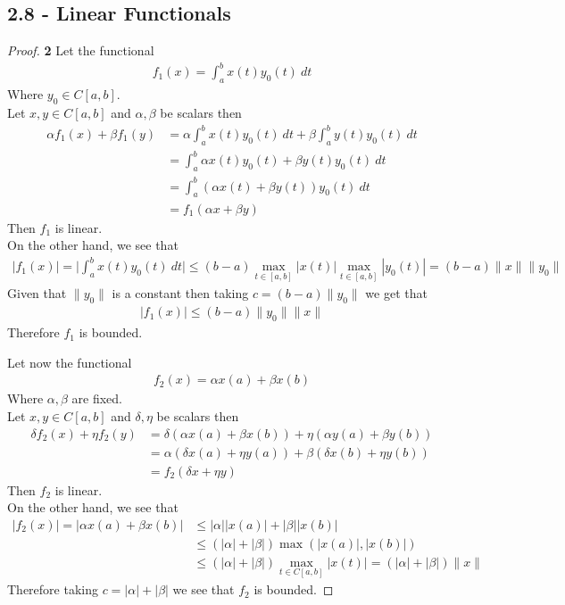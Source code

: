 \documentclass[11pt]{article}
\theoremstyle{definition}
\begin{document}
\subsection*{2.8 - Linear Functionals}
\begin{proof}{\textbf{2}}
    Let the functional
    \begin{align*}
        f_1(x) = \int_a^b x(t)y_0(t)~dt
    \end{align*}
    Where $y_0 \in C[a,b]$.\\
    Let $x,y \in C[a,b]$ and $\alpha, \beta$ be scalars then
    \begin{align*}
        \alpha f_1(x) + \beta f_1(y)
        &= \alpha \int_a^b x(t)y_0(t)~dt + \beta\int_a^b y(t)y_0(t)~dt\\
        &= \int_a^b \alpha x(t)y_0(t) + \beta y(t)y_0(t)~dt\\
        &= \int_a^b (\alpha x(t) + \beta y(t))y_0(t)~dt\\
        &= f_1(\alpha x + \beta y)
    \end{align*}
    Then $f_1$ is linear.\\
    On the other hand, we see that
    \begin{align*}
        |f_1(x)|
        = \bigg|\int_a^b x(t)y_0(t)~dt\bigg|
        \leq (b-a)\max_{t\in[a,b]} |x(t)| \max_{t \in [a,b]} |y_0(t)|
        =(b-a)\|x\|\|y_0\|
    \end{align*}
    Given that $\|y_0\|$ is a constant then taking $c = (b-a) \|y_0\|$ we get
    that
    \begin{align*}
        |f_1(x)| \leq (b-a)\|y_0\|\|x\|
    \end{align*}
    Therefore $f_1$ is bounded.

    Let now the functional
    \begin{align*}
        f_2(x) = \alpha x(a) + \beta x(b)
    \end{align*}
    Where $\alpha, \beta$ are fixed.\\
    Let $x, y \in C[a,b]$ and $\delta, \eta$ be scalars then
    \begin{align*}
        \delta f_2(x) + \eta f_2(y)
        &= \delta(\alpha x(a) + \beta x(b)) + \eta(\alpha y(a) + \beta y(b))\\
        &= \alpha (\delta x(a) + \eta y(a)) + \beta (\delta x(b) + \eta y(b))\\
        &= f_2(\delta x + \eta y)
    \end{align*}
    Then $f_2$ is linear.\\
    On the other hand, we see that
    \begin{align*}
        |f_2(x)| = |\alpha x(a) + \beta x(b)|
        &\leq |\alpha||x(a)| + |\beta||x(b)|\\
        &\leq (|\alpha| + |\beta|)\max(|x(a)|, |x(b)|)\\
        &\leq (|\alpha| + |\beta|)\max_{t \in C[a,b]}|x(t)|
        = (|\alpha| + |\beta|)\|x\|
    \end{align*}
    Therefore taking $c = |\alpha| + |\beta|$ we see that $f_2$ is bounded.
\end{proof}
\end{document}
